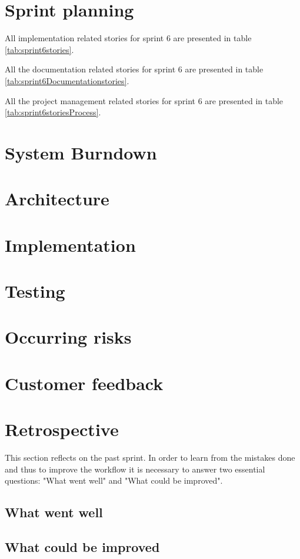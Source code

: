 \section{Sprint planning}
All implementation related stories for sprint 6 are presented in table \ref{tab:sprint6stories}.

All the documentation related stories for sprint 6 are presented in table \ref{tab:sprint6Documentationstories}.

All the project management related stories for sprint 6 are presented in table \ref{tab:sprint6storiesProcess}.
\section{System Burndown}
\section{Architecture}
\section{Implementation}
\section{Testing}
\section{Occurring risks}
\section{Customer feedback}
\section{Retrospective}
This section reflects on the past sprint. In order to learn from the mistakes done and thus to improve the workflow it is necessary to answer two essential questions: "What went well" and "What could be improved".

\subsection{What went well}
\subsection{What could be improved}

